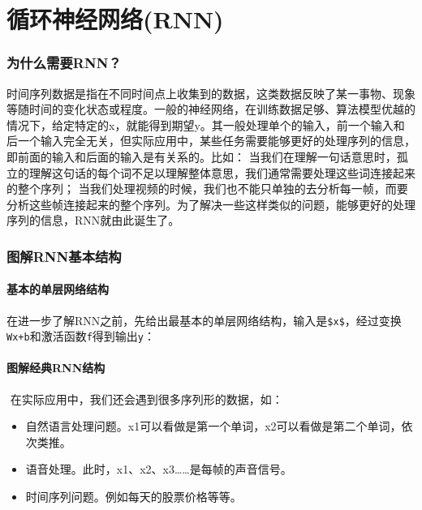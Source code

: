 \chapter{循环神经网络(RNN)}\label{ux7b2cux516dux7ae0-ux5faaux73afux795eux7ecfux7f51ux7edcrnn}

\subsection{为什么需要RNN？}\label{ux4e3aux4ec0ux4e48ux9700ux8981rnn}
时间序列数据是指在不同时间点上收集到的数据，这类数据反映了某一事物、现象等随时间的变化状态或程度。一般的神经网络，在训练数据足够、算法模型优越的情况下，给定特定的x，就能得到期望y。其一般处理单个的输入，前一个输入和后一个输入完全无关，但实际应用中，某些任务需要能够更好的处理序列的信息，即前面的输入和后面的输入是有关系的。比如：
当我们在理解一句话意思时，孤立的理解这句话的每个词不足以理解整体意思，我们通常需要处理这些词连接起来的整个序列；
当我们处理视频的时候，我们也不能只单独的去分析每一帧，而要分析这些帧连接起来的整个序列。为了解决一些这样类似的问题，能够更好的处理序列的信息，RNN就由此诞生了。

\subsection{图解RNN基本结构}\label{ux56feux89e3rnnux57faux672cux7ed3ux6784}

\subsubsection{基本的单层网络结构}\label{ux57faux672cux7684ux5355ux5c42ux7f51ux7edcux7ed3ux6784}

​
在进一步了解RNN之前，先给出最基本的单层网络结构，输入是\texttt{\$x\$}，经过变换\texttt{Wx+b}和激活函数\texttt{f}得到输出\texttt{y}：


\subsubsection{图解经典RNN结构}\label{ux56feux89e3ux7ecfux5178rnnux7ed3ux6784}

​ 在实际应用中，我们还会遇到很多序列形的数据，如：

\begin{itemize}
\item
  自然语言处理问题。x1可以看做是第一个单词，x2可以看做是第二个单词，依次类推。
\item
  语音处理。此时，x1、x2、x3\ldots{}\ldots{}是每帧的声音信号。
\item
  时间序列问题。例如每天的股票价格等等。
\end{itemize}

